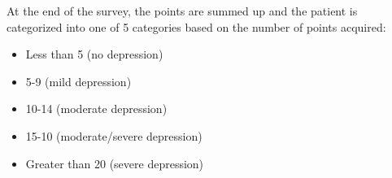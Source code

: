 At the end of the survey, the points are summed up and the patient is categorized into one of 5 categories based on the number of points acquired:

\begin{itemize}
\item Less than 5 (no depression)
\item 5-9 (mild depression)
\item 10-14 (moderate depression)
\item 15-10 (moderate/severe depression)
\item Greater than 20 (severe depression)
\end{itemize}



